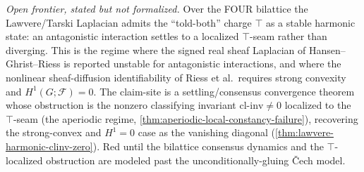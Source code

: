 \begin{theorem}\label{thm:bilattice-stable-top-conflict}\notready{}
\emph{Open frontier, stated but not formalized.} Over the FOUR bilattice the
Lawvere/Tarski Laplacian admits the ``told-both'' charge $\top$ as a stable
harmonic state: an antagonistic interaction settles to a localized $\top$-seam
rather than diverging. This is the regime where the signed real sheaf
Laplacian of Hansen--Ghrist--Riess is reported unstable for antagonistic
interactions, and where the nonlinear sheaf-diffusion identifiability of Riess
et al.\ requires strong convexity and $H^1(G;\mathcal F)=0$. The claim-site is
a settling/consensus convergence theorem whose obstruction is the nonzero
classifying invariant $\mathrm{cl\text{-}inv}\neq0$ localized to the
$\top$-seam (the aperiodic regime,
\cref{thm:aperiodic-local-constancy-failure}), recovering the strong-convex
and $H^1=0$ case as the vanishing diagonal
(\cref{thm:lawvere-harmonic-clinv-zero}). Red until the bilattice consensus
dynamics and the $\top$-localized obstruction are modeled past the
unconditionally-gluing \v{C}ech model.
\end{theorem}
